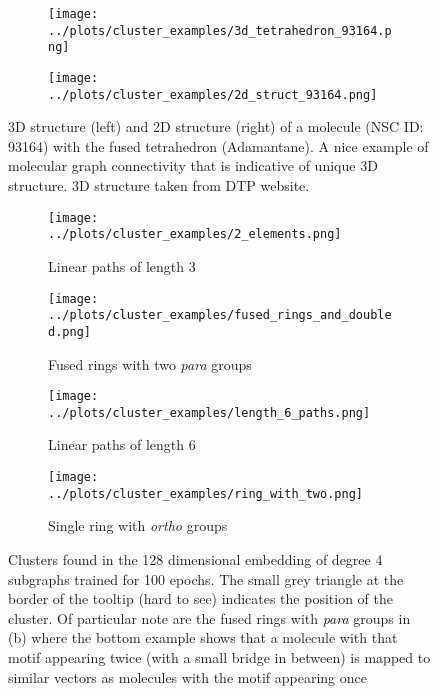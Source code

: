 \begin{figure}[h]
\begin{subfigure}{0.45\textwidth}
\texttt{[image: ../plots/cluster\_examples/3d\_tetrahedron\_93164.png]}
\end{subfigure}
\begin{subfigure}{0.45\textwidth}
\texttt{[image: ../plots/cluster\_examples/2d\_struct\_93164.png]}
\end{subfigure}
\caption{3D structure (left) and 2D structure (right) of a molecule (NSC ID: 93164) with the fused tetrahedron (Adamantane). A nice example of molecular graph connectivity that is indicative of unique 3D structure. 3D structure taken from DTP website.\protect\footnotemark}
\label{fig:3dguy}
\end{figure}


\begin{figure}
\centering
\begin{subfigure}{0.45\textwidth}
    \texttt{[image: ../plots/cluster\_examples/2\_elements.png]}
    \caption{Linear paths of length 3}
\end{subfigure}
\begin{subfigure}{0.45\textwidth}
    \texttt{[image: ../plots/cluster\_examples/fused\_rings\_and\_doubled.png]}
    \caption{Fused rings with two \textit{para} groups}
\end{subfigure}
\begin{subfigure}{0.45\textwidth}
    \texttt{[image: ../plots/cluster\_examples/length\_6\_paths.png]}
    \caption{Linear paths of length 6}
\end{subfigure}
\begin{subfigure}{0.45\textwidth}
    \texttt{[image: ../plots/cluster\_examples/ring\_with\_two.png]}
    \caption{Single ring with \textit{ortho} groups}
\end{subfigure}
\caption{Clusters found in the 128 dimensional embedding of degree 4 subgraphs trained for 100 epochs. The small grey triangle at the border of the tooltip (hard to see) indicates the position of the cluster. Of particular note are the fused rings with \textit{para} groups in (b) where the bottom example shows that a molecule with that motif appearing twice (with a small bridge in between) is mapped to similar vectors as molecules with the motif appearing once}
\label{fig:clusters_100}
\end{figure}

